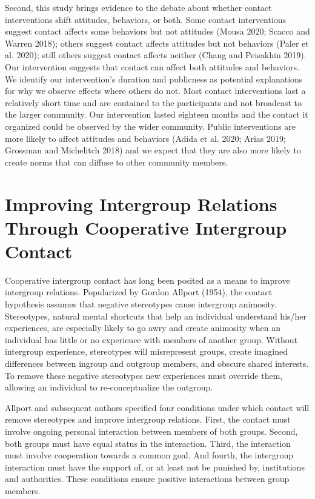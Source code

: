 \documentclass[11pt]{article}
\begin{document}
Second, this study brings evidence to the debate about whether contact
interventions shift attitudes, behaviors, or both. Some contact
interventions suggest contact affects some behaviors but not attitudes
(Mousa 2020; Scacco and Warren 2018); others suggest contact affects
attitudes but not behaviors (Paler et al. 2020); still others suggest
contact affects neither (Chang and Peisakhin 2019). Our intervention
suggests that contact can affect both attitudes and behaviors. We
identify our intervention's duration and publicness as potential
explanations for why we observe effects where others do not. Most
contact interventions last a relatively short time and are contained to
the participants and not broadcast to the larger community. Our
intervention lasted eighteen months and the contact it organized could
be observed by the wider community. Public interventions are more likely
to affect attitudes and behaviors (Adida et al. 2020; Arias 2019;
Grossman and Michelitch 2018) and we expect that they are also more
likely to create norms that can diffuse to other community members.

\hypertarget{improving-intergroup-relations-through-cooperative-intergroup-contact}{%
\section{Improving Intergroup Relations Through Cooperative Intergroup
Contact}\label{improving-intergroup-relations-through-cooperative-intergroup-contact}}

Cooperative intergroup contact has long been posited as a means to
improve intergroup relations. Popularized by Gordon Allport (1954), the
contact hypothesis assumes that negative stereotypes cause intergroup
animosity. Stereotypes, natural mental shortcuts that help an individual
understand his/her experiences, are especially likely to go awry and
create animosity when an individual has little or no experience with
members of another group. Without intergroup experience, stereotypes
will misrepresent groups, create imagined differences between ingroup
and outgroup members, and obscure shared interests. To remove these
negative stereotypes new experiences must override them, allowing an
individual to re-conceptualize the outgroup.

Allport and subsequent authors specified four conditions under which
contact will remove stereotypes and improve intergroup relations. First,
the contact must involve ongoing personal interaction between members of
both groups. Second, both groups must have equal status in the
interaction. Third, the interaction must involve cooperation towards a
common goal. And fourth, the intergroup interaction must have the
support of, or at least not be punished by, institutions and
authorities. These conditions ensure positive interactions between group
members.
\end{document}
